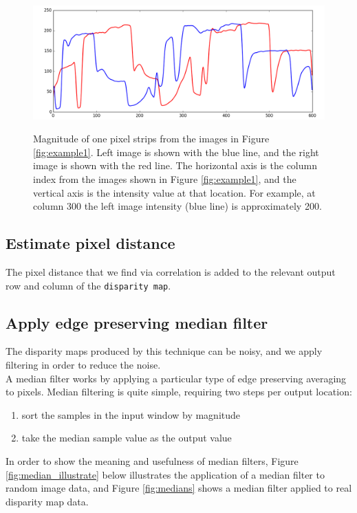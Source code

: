 \documentclass[11pt,fleqn]{article}
\begin{document}
\begin{figure}[!h]
\begin{mdframed}
\centering
\includegraphics[width=1\textwidth]{images/strips.png} \\[2pt]
\caption[Intensity of the one pixel strips taken from the images in Figure \ref{fig:example1}]{Magnitude of one pixel strips from the images in Figure \ref{fig:example1}. Left image is shown with the blue line, and the right image is shown with the red line. The horizontal axis is the column index from the images shown in Figure \ref{fig:example1}, and the vertical axis is the intensity value at that location. For example, at column 300 the left image intensity (blue line) is approximately 200.}
\label{fig:strips}
\end{mdframed}
\end{figure}

\subsection{Estimate pixel distance}
The pixel distance that we find via correlation is added to the relevant output row and column of the \texttt{disparity map}.

\subsection{Apply edge preserving median filter}

The disparity maps produced by this technique can be noisy, and we apply filtering in order to reduce the noise.\\[5pt]
%
A median filter works by applying a particular type of edge preserving averaging to pixels. Median filtering is quite simple, requiring two steps per output location:

\begin{enumerate}
\item sort the samples in the input window by magnitude
\item take the median sample value as the output value
\end{enumerate}
%
In order to show the meaning and usefulness of median filters, Figure \ref{fig:median_illustrate} below illustrates the application of a median filter to random image data, and Figure \ref{fig:medians} shows a median filter applied to real disparity map data.
\end{document}
